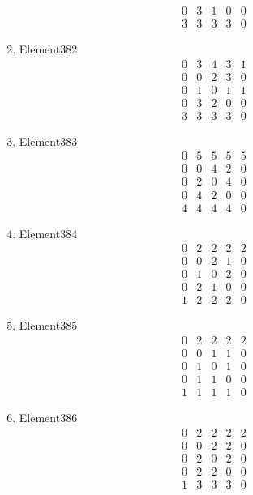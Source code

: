 \documentclass[12pt]{article}
\begin{document}
\begin{multicols}{3}
\begin{enumerate}
\begin{equation*}
\begin{array}{ccccc}
0&3&1&0&0\\
3&3&3&3&0
\end{array}
\end{equation*}
\item Element382
\begin{equation*}
\begin{array}{ccccc}
0&3&4&3&1\\
0&0&2&3&0\\
0&1&0&1&1\\
0&3&2&0&0\\
3&3&3&3&0
\end{array}
\end{equation*}
\item Element383
\begin{equation*}
\begin{array}{ccccc}
0&5&5&5&5\\
0&0&4&2&0\\
0&2&0&4&0\\
0&4&2&0&0\\
4&4&4&4&0
\end{array}
\end{equation*}
\item Element384
\begin{equation*}
\begin{array}{ccccc}
0&2&2&2&2\\
0&0&2&1&0\\
0&1&0&2&0\\
0&2&1&0&0\\
1&2&2&2&0
\end{array}
\end{equation*}
\item Element385
\begin{equation*}
\begin{array}{ccccc}
0&2&2&2&2\\
0&0&1&1&0\\
0&1&0&1&0\\
0&1&1&0&0\\
1&1&1&1&0
\end{array}
\end{equation*}
\item Element386
\begin{equation*}
\begin{array}{ccccc}
0&2&2&2&2\\
0&0&2&2&0\\
0&2&0&2&0\\
0&2&2&0&0\\
1&3&3&3&0
\end{array}
\end{equation*}
\end{enumerate}
\end{multicols}
\end{document}
